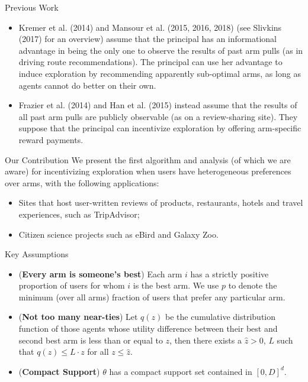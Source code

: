 \documentclass[serif]{beamer}
\begin{document}
\begin{frame}{Previous Work}
\begin{itemize}[label=\textbullet]
\item Kremer et al. (2014) and Mansour et al. (2015, 2016, 2018) (see Slivkins (2017) for an overview) assume that the principal has an informational advantage in being the only one to observe the results of past arm pulls (as in driving route recommendations). The principal can use her advantage to induce exploration by recommending apparently sub-optimal arms, as long as agents cannot do better on their own.
\item Frazier et al. (2014) and Han et al. (2015) instead assume that the results of all past arm pulls are publicly observable (as on a review-sharing site). They suppose that the principal can incentivize exploration by offering arm-specific reward payments.
\end{itemize}
\end{frame}


\begin{frame}{Our Contribution}
We present the first algorithm and analysis (of which we are aware) for incentivizing exploration when users have heterogeneous preferences over arms, with the following applications:
\begin{itemize}[label=\textbullet]
\item Sites that host user-written reviews of products, restaurants, hotels and travel experiences, such as TripAdvisor;
\item Citizen science projects such as eBird and Galaxy Zoo.
\end{itemize}


\end{frame}

\begin{frame}{Key Assumptions}
\begin{itemize}[label=\textbullet]
\item (\textbf{Every arm is someone's best}) Each arm $i$ has a strictly positive proportion of users for whom $i$ is the best arm. We use $p$ to denote the minimum (over all arms) fraction of users that prefer any particular arm.
\item (\textbf{Not too many near-ties}) Let $q(z)$ be the cumulative distribution function of those agents whose utility difference between their best and second best arm is less than or equal to $z$, then there exists a $\hat{z}>0$, $L$ such that $q(z)\leq L\cdot z$ for all $z\leq \hat{z}$.
\item (\textbf{Compact Support}) $\theta$ has a compact support set contained in $[0,D]^{d}$.\
\end{itemize}

\end{frame}
\end{document}
